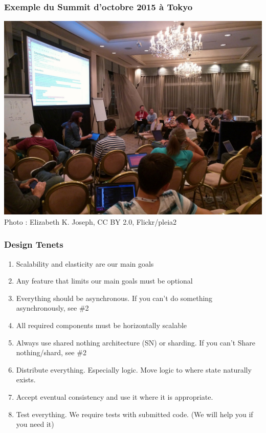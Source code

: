   \begin{frame}
    \frametitle{Exemple du Summit d'octobre 2015 à Tokyo}
    \includegraphics[width=\textwidth]{images/photo-summit4.jpg}
    Photo : Elizabeth K. Joseph, CC BY 2.0, Flickr/pleia2
  \end{frame}

  \begin{frame}
    \frametitle{Design Tenets}
    \begin{enumerate}
      \item Scalability and elasticity are our main goals
      \item Any feature that limits our main goals must be optional
      \item Everything should be asynchronous. If you can't do something asynchronously, see \#2
      \item All required components must be horizontally scalable
      \item Always use shared nothing architecture (SN) or sharding. If you can't Share nothing/shard, see \#2
      \item Distribute everything. Especially logic. Move logic to where state naturally exists.
      \item Accept eventual consistency and use it where it is appropriate.
      \item Test everything. We require tests with submitted code. (We will help you if you need it)
    \end{enumerate}
  \end{frame}

